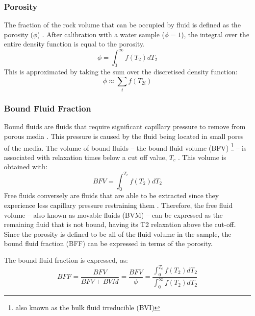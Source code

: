 \subsubsection{Porosity}
The fraction of the rock volume that can be occupied by fluid is defined as the porosity ($\phi$) \cite{PorosityandT2Times}. After calibration with a water sample ($\phi = 1$), the integral over the entire density function is equal to the porosity.
\begin{equation}
    \label{eq:porosity_defn}
    \phi = \int_0^\infty f(T_{2}) dT_{2}
\end{equation}
This is approximated by taking the sum over the discretised density function:
\begin{equation}
    \phi \approx \sum_i f(T_{2 i})
\end{equation}

\subsubsection{Bound Fluid Fraction}
Bound fluids are fluids that require significant capillary pressure to remove from porous media \cite{wellLoggingBook}. This pressure is caused by the fluid being located in small pores of the media. The volume of bound fluids -- the bound fluid volume (BFV) \footnote{also known as the bulk fluid irreducible (BVI)} -- is associated with relaxation times below a cut off value, $T_{c}$ \cite{wellLoggingBook}. This volume is obtained with:
\begin{equation}
    BFV = \int^{T_{c}}_{0} f(T_2) d T_2
    \label{eq:boundFluidVolume}
\end{equation}
Free fluids conversely are fluids that are able to be extracted since they experience less capillary pressure restraining them \cite{NMRForRockskleinberg1993nuclear}\cite{BoundfluidFractionchen1998improving}. Therefore, the free fluid volume -- also known as movable fluids (BVM) -- can be expressed as the remaining fluid that is not bound, having its T2 relaxation above the cut-off. Since the porosity is defined to be all of the fluid volume in the sample, the bound fluid fraction (BFF) can be expressed in terms of the porosity. 

The bound fluid fraction is expressed, as:
\begin{equation}
    BFF = 
    \frac{BFV}{BFV + BVM} =
    \frac{BFV}{\phi} = \frac{\int^{T_{c}}_{0} f(T_2) d T_2}{\int_0^\infty f(T_{2}) dT_{2}}
    \label{eq:boundFluidFraction}
\end{equation}




